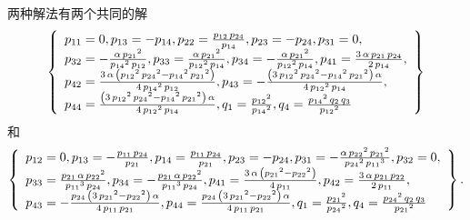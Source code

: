 两种解法有两个共同的解
\begin{equation}
\def\arraystretch{1.2}
\left\{
\begin{array}{l}
{{p}_{11}}=0,
{{p}_{13}}=-{{p}_{14}},
{{p}_{22}}=\frac{{{p}_{12}}\,{{p}_{24}}}{{{p}_{14}}},
{{p}_{23}}=-{{p}_{24}},
{{p}_{31}}=0,\\
{{p}_{32}}=-\frac{\alpha\,{{{p}_{21}}}^{2}}{{{{p}_{14}}}^{2}\,{{p}_{12}}},
{{p}_{33}}=\frac{\alpha\,{{{p}_{21}}}^{2}}{{{{p}_{12}}}^{2}\,{{p}_{14}}},
{{p}_{34}}=-\frac{\alpha\,{{{p}_{21}}}^{2}}{{{{p}_{12}}}^{2}\,{{p}_{14}}},
{{p}_{41}}=\frac{3\,\alpha\,{{p}_{21}}\,{{p}_{24}}}{2\,{{p}_{14}}},\\ 
{{p}_{42}}=\frac{3\,\alpha\,\left( {{{p}_{12}}}^{2}\,{{{p}_{24}}}^{2}-{{{p}_{14}}}^{2}\,{{{p}_{21}}}^{2}\right) }{4\,{{{p}_{14}}}^{2}\,{{p}_{12}}},
{{p}_{43}}=-\frac{\left( 3\,{{{p}_{12}}}^{2}\,{{{p}_{24}}}^{2}-{{{p}_{14}}}^{2}\,{{{p}_{21}}}^{2}\right) \,\alpha}{4\,{{{p}_{12}}}^{2}\,{{p}_{14}}},\\
{{p}_{44}}=\frac{\left( 3\,{{{p}_{12}}}^{2}\,{{{p}_{24}}}^{2}-{{{p}_{14}}}^{2}\,{{{p}_{21}}}^{2}\right) \,\alpha}{4\,{{{p}_{12}}}^{2}\,{{p}_{14}}},
{{q}_{1}}=\frac{{{{p}_{12}}}^{2}}{{{{p}_{14}}}^{2}},
{{q}_{4}}=\frac{{{{p}_{14}}}^{2}\,{{q}_{2}}\,{{q}_{3}}}{{{{p}_{12}}}^{2}}
\end{array}
\right\}
\end{equation}
和
\begin{equation}
\def\arraystretch{1.2}
\left\{
\begin{array}{l}
{{p}_{12}}=0,
{{p}_{13}}=-\frac{{{p}_{11}}\,{{p}_{24}}}{{{p}_{21}}},
{{p}_{14}}=\frac{{{p}_{11}}\,{{p}_{24}}}{{{p}_{21}}},
{{p}_{23}}=-{{p}_{24}},
{{p}_{31}}=-\frac{\alpha\,{{{p}_{22}}}^{2}\,{{{p}_{21}}}^{2}}{{{{p}_{24}}}^{2}\,{{{p}_{11}}}^{3}},
{{p}_{32}}=0,\\ 
{{p}_{33}}=\frac{{{p}_{21}}\,\alpha\,{{{p}_{22}}}^{2}}{{{{p}_{11}}}^{3}\,{{p}_{24}}},
{{p}_{34}}=-\frac{{{p}_{21}}\,\alpha\,{{{p}_{22}}}^{2}}{{{{p}_{11}}}^{3}\,{{p}_{24}}},
{{p}_{41}}=\frac{3\,\alpha\,\left( {{{p}_{21}}}^{2}-{{{p}_{22}}}^{2}\right) }{4\,{{p}_{11}}},
{{p}_{42}}=\frac{3\,\alpha\,{{p}_{21}}\,{{p}_{22}}}{2\,{{p}_{11}}},\\ 
{{p}_{43}}=-\frac{{{p}_{24}}\,\left( 3\,{{{p}_{21}}}^{2}-{{{p}_{22}}}^{2}\right) \,\alpha}{4\,{{p}_{11}}\,{{p}_{21}}},
{{p}_{44}}=\frac{{{p}_{24}}\,\left( 3\,{{{p}_{21}}}^{2}-{{{p}_{22}}}^{2}\right) \,\alpha}{4\,{{p}_{11}}\,{{p}_{21}}},
{{q}_{1}}=\frac{{{{p}_{21}}}^{2}}{{{{p}_{24}}}^{2}},
{{q}_{4}}=\frac{{{{p}_{24}}}^{2}\,{{q}_{2}}\,{{q}_{3}}}{{{{p}_{21}}}^{2}}
\end{array}
\right\} . 
\end{equation}

